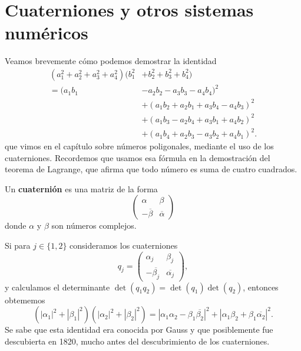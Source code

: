 \section*{Cuaterniones y otros sistemas numéricos}

Veamos brevemente cómo podemos demostrar la identidad 
	\begin{equation*}
		\begin{aligned}
			(a_1^2+a_2^2+a_3^2+a_4^2)(b_1^2&+b_2^2+b_3^2+b_4^2)\\
			=(a_1 b_1 &- a_2 b_2 - a_3 b_3 - a_4 b_4)^2\\
			&+(a_1 b_2 + a_2 b_1 + a_3 b_4 - a_4 b_3)^2\\
			&+(a_1 b_3 - a_2 b_4 + a_3 b_1 + a_4 b_2)^2\\
			&+(a_1 b_4 + a_2 b_3 - a_3 b_2 + a_4 b_1)^2.
		\end{aligned}
	\end{equation*}
que vimos en el capítulo sobre números poligonales, mediante el uso de los
cuaterniones.  Recordemos que usamos esa fórmula en la demostración del teorema de Lagrange, 
que afirma que todo número es suma de cuatro cuadrados.

Un \textbf{cuaternión}
es una matriz de la forma
\begin{equation}
	\begin{pmatrix}
		\alpha & \beta\\
		-\overline{\beta} & \overline{\alpha}
	\end{pmatrix}
\end{equation}
donde $\alpha$ y $\beta$ son números complejos. 

%

Si para $j\in\{1,2\}$ consideramos los cuaterniones 
\[
	q_j=\begin{pmatrix}
		\alpha_j & \beta_j\\
		-\overline{\beta_j} & \overline{\alpha_j}
	\end{pmatrix},
\]
y calculamos el determinante $\det(q_1q_2)=\det(q_1)\det(q_2)$, entonces
obtememos 
\begin{equation}
	\label{eq:Gauss}
	(|\alpha_1|^2+|\beta_1|^2)(|\alpha_2|^2+|\beta_2|^2)=|\alpha_1\alpha_2-\beta_1\overline{\beta_2}|^2+|\alpha_1\beta_2+\beta_1\overline{\alpha_2}|^2.
\end{equation}
Se sabe que esta identidad era conocida por Gauss y que posiblemente fue
descubierta en 1820, mucho antes del descubrimiento de los cuaterniones. 

